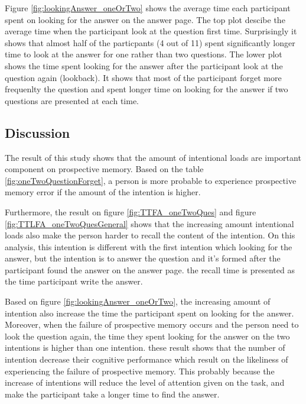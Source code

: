 Figure \ref{fig:lookingAnswer_oneOrTwo} shows the average time each participant spent on looking for the answer on the answer page. The top plot descibe the average time when
the participant look at the question first time. Surprisingly it shows that almost half of the particpants (4 out of 11) spent significantly longer time to look at the answer for one rather than two questions.
The lower plot shows the time spent looking for the answer after the participant look at the question again (lookback). It shows that most of the participant forget more frequenlty the
question and spent longer time on looking for the answer if two questions are presented at each time.

\subsection{Discussion}

The result of this study shows that the amount of intentional loads are important component on prospective memory. Based on the table \ref{fig:oneTwoQuestionForget}, a person is more probable to experience
prospective memory error if the amount of the intention is higher.

Furthermore, the result on figure \ref{fig:TTFA_oneTwoQues} and figure \ref{fig:TTLFA_oneTwoQuesGeneral} shows that the increasing amount intentional loads also make the person harder to recall the content of the intention. On this analysis,
this intention is different with the first intention which looking for the answer, but the intention
is to answer the question and it's formed after the participant found the answer on the answer page. the recall time is presented as the time participant write the answer.

Based on figure \ref{fig:lookingAnswer_oneOrTwo}, the increasing amount of intention also increase the time the participant spent on looking for the answer.
Moreover, when the failure of prospective memory occurs and the person need to look the question again, the time they spent looking for the answer on the two intentions is higher than one intention.
these result shows that the number of intention decrease their cognitive performance which result on the likeliness of experiencing the failure of prospective memory.
This probably because the increase of intentions will reduce the level of attention given on the task\citep{Reason1984}, and make
the participant take a longer time to find the answer.



